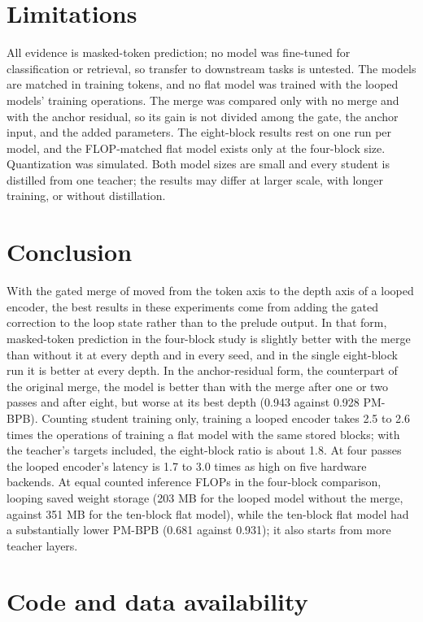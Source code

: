 \documentclass[11pt]{article}
\begin{document}
\section{Limitations}

All evidence is masked-token prediction; no model was fine-tuned for classification or retrieval, so transfer to downstream tasks is untested.
The models are matched in training tokens, and no flat model was trained with the looped models' training operations. The merge was compared
only with no merge and with the anchor residual, so its gain is not divided among the gate, the anchor input, and the added parameters. The
eight-block results rest on one run per model, and the FLOP-matched flat model exists only at the four-block size. Quantization was simulated.
Both model sizes are small and every student is distilled from one teacher; the results may differ at larger scale, with longer training, or
without distillation.

\section{Conclusion}

With the gated merge of \citet{zhang2026rlt} moved from the token axis to the depth axis of a looped encoder, the best results in these
experiments come from adding the gated correction to the loop state rather than to the prelude output. In that form, masked-token prediction in
the four-block study is slightly better with the merge than without it at every depth and in every seed, and in the single eight-block run it is
better at every depth. In the anchor-residual form, the counterpart of the original merge, the model is better than with the merge after one or
two passes and after eight, but worse at its best depth (0.943 against 0.928 PM-BPB). Counting student training only, training a looped encoder
takes 2.5 to 2.6 times the operations of training a flat model with the same stored blocks; with the teacher's targets included, the eight-block
ratio is about 1.8. At four passes the looped encoder's latency is 1.7 to 3.0 times as high on five hardware backends. At equal counted
inference FLOPs in the four-block comparison, looping saved weight storage (203 MB for the looped model without the merge, against 351 MB for
the ten-block flat model), while the ten-block flat model had a substantially lower PM-BPB (0.681 against 0.931); it also starts from more
teacher layers.

\section*{Code and data availability}
\end{document}
